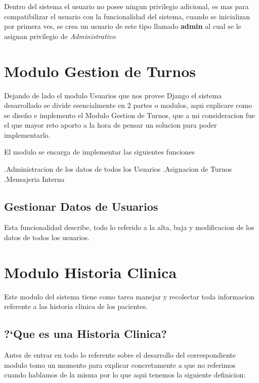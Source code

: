 Dentro del sistema el usuario no posee ningun privilegio adicional, es mas para 
compatibilizar el usuario con la funcionalidad del sistema, cuando se inicializan
por primera ves, se crea un usuario de este tipo llamado \textbf{admin} al cual
se le asignan privilegio de \textit{Administrativo}



\section{Modulo Gestion de Turnos}

Dejando de lado el modulo Usuarios que nos provee Django el sistema desarrollado 
se divide esencialmente en 2 partes o modulos, aqui explicare como se dise\~no e
implemento el Modulo Gestion de Turnos, que a mi consideracion fue el que mayor
reto aporto a la hora de pensar un solucion para poder implementarlo.

El modulo se encarga de implementar las siguientes funciones

.Administracion de los datos de todos los Usuarios
.Asignacion de Turnos
.Mensajeria Interna

\subsection {Gestionar Datos de Usuarios}

Esta funcionalidad describe, todo lo referido a la alta, baja y modificacion de 
los datos de todos los usuarios.


\section{Modulo Historia Clinica}

Este modulo del sistema tiene como tarea manejar y recolectar toda informacion 
referente a las historia clinica de los pacientes.

\subsection{?`Que es una Historia Clinica?}

Antes de entrar en todo lo referente sobre el desarrollo del correspondiente modulo
tomo un momento para explicar concretamente a que no referimos cuando hablamos de 
la misma por lo que aqui tenemos la siguiente definicion:

